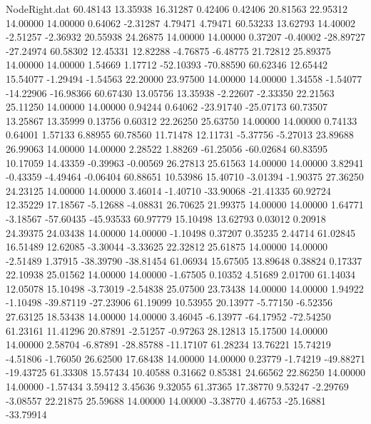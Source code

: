 \begin{filecontents}{NodeRight.dat}
  60.48143   13.35938   16.31287     0.42406    0.42406   20.81563   22.95312   14.00000   14.00000    0.64062   -2.31287    4.79471    4.79471
  60.53233   13.62793   14.40002    -2.51257   -2.36932   20.55938   24.26875   14.00000   14.00000    0.37207   -0.40002  -28.89727  -27.24974
  60.58302   12.45331   12.82288    -4.76875   -6.48775   21.72812   25.89375   14.00000   14.00000    1.54669    1.17712  -52.10393  -70.88590
  60.62346   12.65442   15.54077    -1.29494   -1.54563   22.20000   23.97500   14.00000   14.00000    1.34558   -1.54077  -14.22906  -16.98366
  60.67430   13.05756   13.35938    -2.22607   -2.33350   22.21563   25.11250   14.00000   14.00000    0.94244    0.64062  -23.91740  -25.07173
  60.73507   13.25867   13.35999     0.13756    0.60312   22.26250   25.63750   14.00000   14.00000    0.74133    0.64001    1.57133    6.88955
  60.78560   11.71478   12.11731    -5.37756   -5.27013   23.89688   26.99063   14.00000   14.00000    2.28522    1.88269  -61.25056  -60.02684
  60.83595   10.17059   14.43359    -0.39963   -0.00569   26.27813   25.61563   14.00000   14.00000    3.82941   -0.43359   -4.49464   -0.06404
  60.88651   10.53986   15.40710    -3.01394   -1.90375   27.36250   24.23125   14.00000   14.00000    3.46014   -1.40710  -33.90068  -21.41335
  60.92724   12.35229   17.18567    -5.12688   -4.08831   26.70625   21.99375   14.00000   14.00000    1.64771   -3.18567  -57.60435  -45.93533
  60.97779   15.10498   13.62793     0.03012    0.20918   24.39375   24.03438   14.00000   14.00000   -1.10498    0.37207    0.35235    2.44714
  61.02845   16.51489   12.62085    -3.30044   -3.33625   22.32812   25.61875   14.00000   14.00000   -2.51489    1.37915  -38.39790  -38.81454
  61.06934   15.67505   13.89648     0.38824    0.17337   22.10938   25.01562   14.00000   14.00000   -1.67505    0.10352    4.51689    2.01700
  61.14034   12.05078   15.10498    -3.73019   -2.54838   25.07500   23.73438   14.00000   14.00000    1.94922   -1.10498  -39.87119  -27.23906
  61.19099   10.53955   20.13977    -5.77150   -6.52356   27.63125   18.53438   14.00000   14.00000    3.46045   -6.13977  -64.17952  -72.54250
  61.23161   11.41296   20.87891    -2.51257   -0.97263   28.12813   15.17500   14.00000   14.00000    2.58704   -6.87891  -28.85788  -11.17107
  61.28234   13.76221   15.74219    -4.51806   -1.76050   26.62500   17.68438   14.00000   14.00000    0.23779   -1.74219  -49.88271  -19.43725
  61.33308   15.57434   10.40588     0.31662    0.85381   24.66562   22.86250   14.00000   14.00000   -1.57434    3.59412    3.45636    9.32055
  61.37365   17.38770    9.53247    -2.29769   -3.08557   22.21875   25.59688   14.00000   14.00000   -3.38770    4.46753  -25.16881  -33.79914

\end{filecontents}
